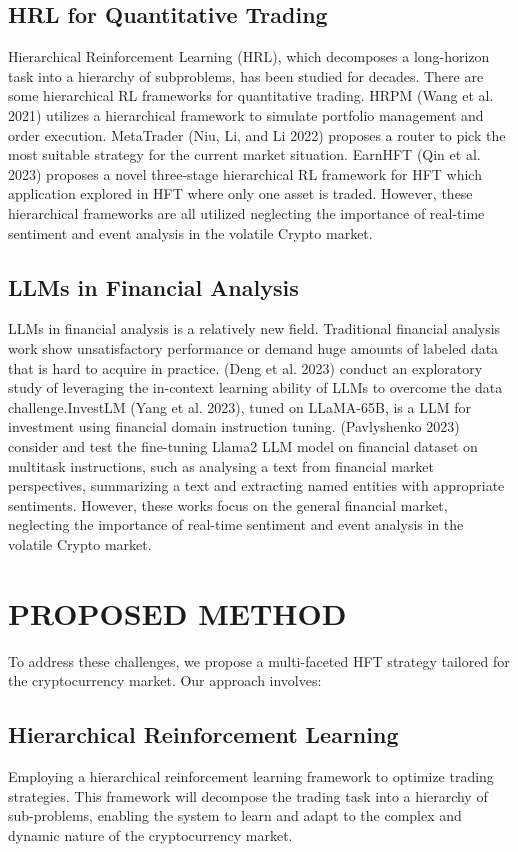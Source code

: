 \documentclass[conference]{IEEEtran}
\begin{document}
\subsection{HRL for Quantitative Trading}

Hierarchical Reinforcement Learning (HRL), which decomposes a long-horizon task into a hierarchy of subproblems, has been studied for decades. There are some hierarchical RL frameworks for quantitative trading. HRPM (Wang et al. 2021) utilizes a hierarchical framework to simulate portfolio management and order execution. MetaTrader (Niu, Li, and Li 2022) proposes a router to pick the most suitable strategy for the current market situation. EarnHFT (Qin et al. 2023) proposes a novel three-stage hierarchical RL framework for HFT which application explored in HFT where only one asset is traded. However, these hierarchical frameworks are all utilized neglecting the importance of real-time sentiment and event analysis in the volatile Crypto market.

\subsection{LLMs in Financial Analysis}

LLMs in financial analysis is a relatively new field. Traditional financial analysis work show unsatisfactory performance or demand huge amounts of labeled data that is hard to acquire in practice. (Deng et al. 2023) conduct an exploratory study of leveraging the in-context learning ability of LLMs to overcome the data challenge.InvestLM (Yang et al. 2023), tuned on LLaMA-65B, is a LLM for investment using financial domain instruction tuning. (Pavlyshenko 2023) consider and test the fine-tuning Llama2 LLM model on financial dataset on multitask instructions, such as analysing a text from financial market perspectives, summarizing a text and extracting named entities with appropriate sentiments. However, these works focus on the general financial market, neglecting the importance of real-time sentiment and event analysis in the volatile Crypto market.

\section{PROPOSED METHOD}
To address these challenges, we propose a multi-faceted HFT strategy tailored for the cryptocurrency market. Our approach involves:

\subsection{Hierarchical Reinforcement Learning}
Employing a hierarchical reinforcement learning framework to optimize trading strategies. This framework will decompose the trading task into a hierarchy of sub-problems, enabling the system to learn and adapt to the complex and dynamic nature of the cryptocurrency market.
\end{document}
